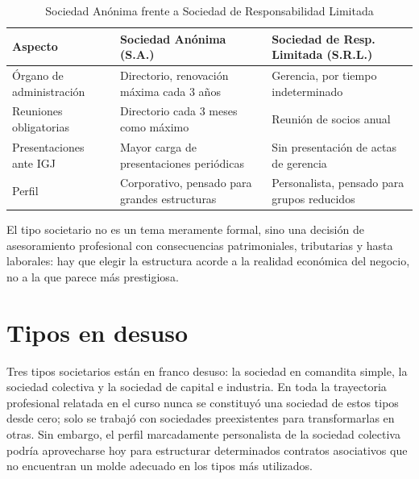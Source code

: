 \documentclass[12pt,oneside]{book}
\begin{document}
\begin{table}[H]
\centering
\caption{Sociedad Anónima frente a Sociedad de Responsabilidad Limitada}
\renewcommand{\arraystretch}{1.2}
\begin{tabularx}{\textwidth}{>{\raggedright\arraybackslash}p{}XX}
\toprule
\textbf{Aspecto} & \textbf{Sociedad Anónima (S.A.)} & \textbf{Sociedad de Resp. Limitada (S.R.L.)} \\
\midrule
Órgano de administración & Directorio, renovación máxima cada 3 años & Gerencia, por tiempo indeterminado \\
Reuniones obligatorias & Directorio cada 3 meses como máximo & Reunión de socios anual \\
Presentaciones ante IGJ & Mayor carga de presentaciones periódicas & Sin presentación de actas de gerencia \\
Perfil & Corporativo, pensado para grandes estructuras & Personalista, pensado para grupos reducidos \\
\bottomrule
\end{tabularx}
\end{table}

\begin{important}
El tipo societario no es un tema meramente formal, sino una decisión de asesoramiento profesional con consecuencias patrimoniales, tributarias y hasta laborales: hay que elegir la estructura acorde a la realidad económica del negocio, no a la que parece más prestigiosa.
\end{important}

\section{Tipos en desuso}

Tres tipos societarios están en franco desuso: la sociedad en comandita simple, la sociedad colectiva y la sociedad de capital e industria. En toda la trayectoria profesional relatada en el curso nunca se constituyó una sociedad de estos tipos desde cero; solo se trabajó con sociedades preexistentes para transformarlas en otras. Sin embargo, el perfil marcadamente personalista de la sociedad colectiva podría aprovecharse hoy para estructurar determinados contratos asociativos que no encuentran un molde adecuado en los tipos más utilizados.
\end{document}
